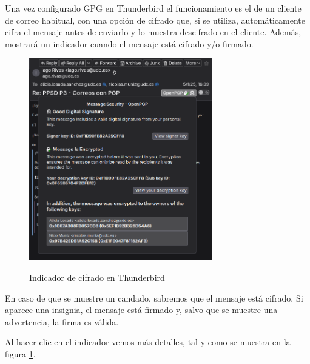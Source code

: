 \begin{tcolorbox}[
    colback=orange!5!white,
    colframe=orange!75!black,
    title=El indicador de cifrado
]
Una vez configurado GPG en Thunderbird el funcionamiento es el de un cliente de correo habitual, con una opción de cifrado que, si se utiliza, automáticamente cifra el mensaje antes de enviarlo y lo muestra descifrado en el cliente. Además, mostrará un indicador cuando el mensaje está cifrado y/o firmado.

\begin{figure}[H]
    \centering
    \includegraphics[width=8cm]{thunderbird-indicador.png}
    \label{fig:indicador}
    \caption{Indicador de cifrado en Thunderbird}
\end{figure}

En caso de que se muestre un candado, sabremos que el mensaje está cifrado. Si aparece una insignia, el mensaje está firmado y, salvo que se muestre una advertencia, la firma es válida.

Al hacer clic en el indicador vemos más detalles, tal y como se muestra en la figura \ref{fig:indicador}.
\end{tcolorbox}


